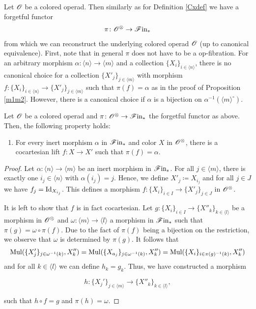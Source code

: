 Let $\mathscr{O}$ be a colored operad. Then similarly as for Definition \ref{Cxdef} we
have a forgetful functor 
\[
\pi \colon \mathscr{O}^{\otimes} \to \mathscr{F} \text{in}_{\ast}
\]
from which we can reconstruct the underlying colored operad $\mathscr{O}$ (up to
canonical equivalence). First, note that in general $\pi$ does not have to be a
op-fibration. For an arbitrary morphism $\alpha \colon \langle n \rangle \to
\langle m \rangle$ and a collection $\{X_i\}_{i \in \langle n \rangle}$, there
is no canonical choice for a collection $\{X'_j\}_{j \in \langle m \rangle}$
with morphism $f \colon \{X_i\}_{i \in \langle n \rangle} \to \{X'_j\}_{j \in
\langle m \rangle}$ such that $\pi(f)=\alpha$ as in the proof of Proposition
\ref{m1m2}. However, there is a canonical choice if $\alpha$ is a bijection on
$\alpha^{-1}(\langle m \rangle^{\circ})$. 
\begin{prop}
    Let $\mathscr{O}$ be a colored operad and $\pi \colon \mathscr{O}^{\otimes} \to \mathscr{F} \text{in}_{\ast}$ the forgetful
    functor as above. Then, the following property holds:
    \begin{enumerate}[(M1')]
    \item For every inert morphism $\alpha$ in $\mathscr{F} \text{in}_{\ast}$ and color $X$ in $\mathscr{O}^{\otimes}$,
    there is a cocartesian lift $f \colon X \to X'$ such that $\pi(f)=\alpha$.
    \end{enumerate}
\end{prop}

\begin{proof}
    Let $\alpha \colon \langle n \rangle \to \langle m \rangle$ be an inert
    morphism in $\mathscr{F} \text{in}_{\ast}$. For all $j \in \langle m \rangle$, there is exactly one
    $i_j \in \langle n \rangle$ with $\alpha(i_j) = j$. Hence, we define $X'_j
    \coloneqq X_{i_j}$ and for all $j \in J$ we have $f_j = \operatorname{Id}_{X_{i_j}}$. This
    defines a morphism $f \colon \{X_i\}_{i \in I} \to \{X'_j\}_{j \in J}$ in
    $\mathscr{O}^{\otimes}$.

    It is left to show that $f$ is in fact cocartesian. Let $g \colon \{X_i\}_{i
    \in I} \to \{X''_k\}_{k \in \langle  l \rangle}$ be a morphism in $\mathscr{O}^{\otimes}$ and
    $\omega \colon \langle m \rangle \to \langle l \rangle$ a morphism in $\mathscr{F} \text{in}_{\ast}$
    such that $\pi(g) = \omega \circ \pi(f)$. Due to the fact of $\pi(f)$ being
    a bijection on the restriction, we observe that $\omega$ is determined by
    $\pi(g)$. It follows that
    \[
        \operatorname{Mul}(\{X_j'\}_{j \in \omega^{-1}(k)}, X_k'') = \operatorname{Mul}(\{X_{a_j}\}_{j \in \omega^{-1}(k)}, X_k'') = \operatorname{Mul}(\{X_i\}_{i \in \pi(g)^{-1}(k)}, X_k'')
    \]
    and for all $k \in \langle l \rangle$ we can define $h_k = g_k$. Thus, we
    have constructed a morphism 

    $$h \colon \{X_j'\}_{j \in \langle m \rangle} \to \{X''_k\}_{k \in \langle l
    \rangle},$$
    
    such that $h \circ f = g$ and $\pi(h)=\omega$. 
\end{proof}


